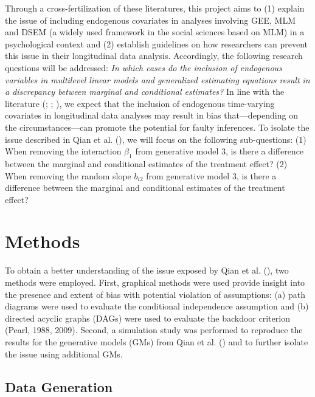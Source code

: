 \documentclass[
  12pt,
  a4paper,
]{article}
\begin{document}
Through a cross-fertilization of these literatures, this project aims to
(1) explain the issue of including endogenous covariates in analyses
involving GEE, MLM and DSEM (a widely used framework in the social
sciences based on MLM) in a psychological context and (2) establish
guidelines on how researchers can prevent this issue in their
longitudinal data analysis. Accordingly, the following research
questions will be addressed: \emph{In which cases do the inclusion of
endogenous variables in multilevel linear models and generalized
estimating equations result in a discrepancy between marginal and
conditional estimates?} In line with the literature
(; ; ), we
expect that the inclusion of endogenous time-varying covariates in
longitudinal data analyses may result in bias that---depending on the
circumstances---can promote the potential for faulty inferences. To
isolate the issue described in Qian et al.
(), we will focus on the following
sub-questions: (1) When removing the interaction \(\beta_1\) from
generative model 3, is there a difference between the marginal and
conditional estimates of the treatment effect? (2) When removing the
random slope \(b_{i2}\) from generative model 3, is there a difference
between the marginal and conditional estimates of the treatment effect?

\newpage

\section{Methods}\label{methods}

To obtain a better understanding of the issue exposed by Qian et al.
(), two methods were employed. First,
graphical methods were used provide insight into the presence and extent
of bias with potential violation of assumptions: (a) path diagrams were
used to evaluate the conditional independence assumption and (b)
directed acyclic graphs (DAGs) were used to evaluate the backdoor
criterion (Pearl, 1988, 2009). Second, a simulation study was performed
to reproduce the results for the generative models (GMs) from Qian et
al. () and to further isolate the issue
using additional GMs.

\subsection{Data Generation}\label{data-generation}
\end{document}
